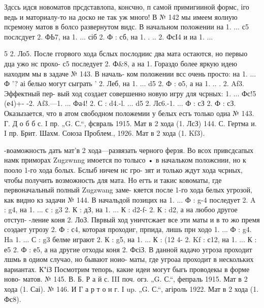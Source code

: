 Здссь идся новоматов прсдставлопа, консчно, п самой примигииной формс, іго ведь и маториалу-то на доско не так уж много!
В № 142 мы имеем яолную псремону матов в болсо развернутом видс. В начальном положении на 1. ... с5 послсдует 2. ФЬ7, на 1. ... сіб
2. Ф : сб, на 1. . .. 2. ФсІ4 и иа 1. ... {5 2. Ло5. После ггорвого хода бслых послодиис два мата остаются, но первыо дца ужо нс прохо-
с5 последует 2. Ф&8, а на 1.
Гораздо более яркую идею находим мы в задаче № 143. В началь- ком положении всс очень просто: на 1. ... Ф '? аі белыо могут сыграть ' 2. Леб, на 1. ... d5 2. Ф : о5, а на 1. .. . 2. Af3. Эффектный пер- вый ход создает совершенно новую игру для чсрных: 1. ... Фс!5 (е4)+- -2. Af3.—1. ... Фа4! 2. С : d4.-l. ... d5 2. Лс6.-1. ... Ф : сЗ 2. Ф : сЗ. Оказызается, что в атом свободном положемии у белых есгь только одиа
№ 143. Г. Д о б б с.
I пр. „G. С.“, фсвраль 1915.
Мат в 2 хода (1. ЛсЗ)	144. С. Гертма и.
I пр. Брит. Шахм. Союза Проблем., 1926.
Мат в 2 хода (1. Kf3).

-воаможность дать мат'в 2 хода—развязать черного ферзя.
Во всох привсдсапых намк приморах Zugzwnng имоется по толысо
• в начальком положснии, но к пооло 1-го хода болых. Бслыб ничем нс гро- зят и только ждут хода чсрных, чтобы получить возможность для мата. Но егть и такис ковоматы, где первоначальный полный Zugzwang заме- кяется после 1-го хода белых угрозой, как видно кз задачи № 144. В начальдой позицих на 1. ... Ф : g-4 последует 2. A : g4, на 1. ... с : g3 2. К : дЗ, на 1. ... К : d2-f- 2. К : d2, а на любоо другое отступ- -ление коня 2. ЛоЗ. Пврвый ход уничтсжает все эти маты и в то жо
премя соэдает угрозу 2. Ф : с4, которая проходиг, прпида, лишь прн ходо
1. ... Ф : g4. Ha 1. ... С : g3 белме играют 2. К : g5, на 1. ... К : (12 4-
2. Kf : с12, на 1. ... К : е5 2. Ф : е5, а на другие отходы коня 2. ФсіЗ. В данной яадачо угроза проходит лшмь в одиом случао, но бывают ноио- маты, где угроаа проходит в нескольких вариантах.
К"іЗ Посмотрим тепорь, какие идеи могут быгь проводекы в форме ново- матов.
№ 145. В. Б. Р а й с.
III поч. огз. „G. С.“, фепраль 1915.
Мат в 2 хода (1. Саі).
	№ 146. И Г а р т о н г.
I up. „G. С.“, агіроль 1922.
Мат в 2 хода (1. Фс8).


}

